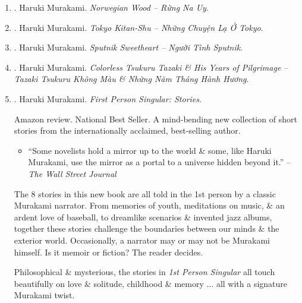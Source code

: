 \documentclass{article}
\begin{document}
\begin{enumerate}
	\item \cite{Murakami_Norwegian_wood_VN}. {\sc Haruki Murakami}. {\it Norwegian Wood -- Rừng Na Uy}.\hfill{\sf[done]}
	
	\item \cite{Murakami_Tokyo_VN}. {\sc Haruki Murakami}. {\it Tokyo Kitan-Shu -- Những Chuyện Lạ Ở Tokyo}.\hfill{\sf[done]}
	
	\item \cite{Murakami_Sputnik_VN}. Haruki Murakami. {\it Sputnik Sweetheart -- Người Tình Sputnik}.\hfill{\sf[done]}
	
	\item \cite{Murakami_Tsukuru_Tazaki_VN}. Haruki Murakami. {\it Colorless Tsukuru Tazaki \& His Years of Pilgrimage -- Tazaki Tsukuru Không Màu \& Những Năm Tháng Hành Hương}.\hfill{\sf[done]}
	
	\item \cite{Murakami_1st_person}. {\sc Haruki Murakami}. {\it First Person Singular: Stories}. {}
	
	{\sf Amazon review.} National Best Seller. A mind-bending new collection of short stories from the internationally acclaimed, best-selling author.
	\begin{itemize}
		\item ``Some novelists hold a mirror up to the world \& some, like {\sc Haruki Murakami}, use the mirror as a portal to a universe hidden beyond it.'' -- {\it The Wall Street Journal}
	\end{itemize}
	The 8 stories in this new book are all told in the 1st person by a classic {\sc Murakami} narrator. From memories of youth, meditations on music, \& an ardent love of baseball, to dreamlike scenarios \& invented jazz albums, together these stories challenge the boundaries between our minds \& the exterior world. Occasionally, a narrator may or may not be {\sc Murakami} himself. Is it memoir or fiction? The reader decides.
	
	Philosophical \& mysterious, the stories in {\it1st Person Singular} all touch beautifully on love \& solitude, childhood \& memory $\ldots$ all with a signature {\sc Murakami} twist.
	

\end{enumerate}
\end{document}
